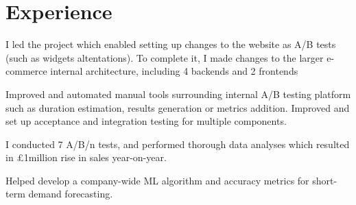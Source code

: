 \documentclass[]{CV}
\begin{document}
%
%


%
%

\begin{minipage}[t]{0.705\textwidth} 



\section{Experience}
\vspace{\topsep} %
\quad
\begin{tightemize}


\item I led the project which enabled setting up changes to the website as A/B tests (such as widgets altentations). To complete it, I made changes to the larger e-commerce internal architecture, including 4 backends and 2 frontends

\item Improved and automated manual tools surrounding internal A/B testing platform such as duration estimation, results generation or metrics addition. Improved and set up acceptance and integration testing for multiple components.

\item I conducted 7 A/B/n tests, and performed thorough data analyses which resulted in £1million rise in sales year-on-year.

\item Helped develop a company-wide ML algorithm and accuracy metrics for short-term demand forecasting.


\end{tightemize}
\end{minipage}
\end{document}
